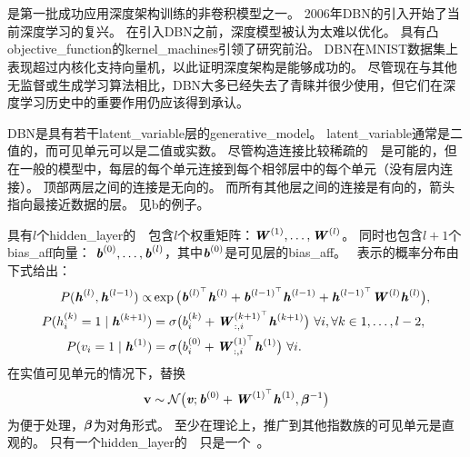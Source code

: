 
\section{}
\label{sec:deep_belief_networks}

是第一批成功应用深度架构训练的非卷积模型之一\citep{Hinton06,hinton2007learning}。
2006年\gls{DBN}的引入开始了当前深度学习的复兴。
在引入\gls{DBN}之前，深度模型被认为太难以优化。
具有凸\gls{objective_function}的\gls{kernel_machines}引领了研究前沿。
\gls{DBN}在MNIST数据集上表现超过内核化支持向量机，以此证明深度架构是能够成功的\citep{Hinton06}。
尽管现在与其他无监督或生成学习算法相比，\gls{DBN}大多已经失去了青睐并很少使用，但它们在深度学习历史中的重要作用仍应该得到承认。

\gls{DBN}是具有若干\gls{latent_variable}层的\gls{generative_model}。
\gls{latent_variable}通常是二值的，而可见单元可以是二值或实数。
尽管构造连接比较稀疏的~~是可能的，但在一般的模型中，每层的每个单元连接到每个相邻层中的每个单元（没有层内连接）。
顶部两层之间的连接是无向的。
而所有其他层之间的连接是有向的，箭头指向最接近数据的层。
见b的例子。


具有$l$个\gls{hidden_layer}的~~包含$l$个权重矩阵：$\boldsymbol{\mathit{W}}^{(1)},\ldots, \boldsymbol{\mathit{W}}^{(l)}$。
同时也包含$l+1$个\gls{bias_aff}向量：
$\boldsymbol{\mathit{b}}^{(0)},\ldots,\boldsymbol{\mathit{b}}^{(l)}$，其中$\boldsymbol{\mathit{b}}^{(0)}$是可见层的\gls{bias_aff}。
~表示的概率分布由下式给出：
\begin{align}
 P(\boldsymbol{\mathit{h}}^{(l)}, \boldsymbol{\mathit{h}}^{(l-1)}) \propto& \exp \big( \boldsymbol{\mathit{b}}^{(l)^\top} \boldsymbol{\mathit{h}}^{(l)} +  \boldsymbol{\mathit{b}}^{(l-1)^\top} \boldsymbol{\mathit{h}}^{(l-1)}
 + \boldsymbol{\mathit{h}}^{(l-1)^\top} \boldsymbol{\mathit{W}}^{(l)} \boldsymbol{\mathit{h}}^{(l)} \big), \\
 P(h_i^{(k)} = 1  \mid  \boldsymbol{\mathit{h}}^{(k+1)}) &= \sigma \big( b_i^{(k)} + \boldsymbol{\mathit{W}}_{:,i}^{(k+1)^\top} \boldsymbol{\mathit{h}}^{(k+1)} 
                                                          \big)~ \forall i,  \forall k \in 1, \ldots, l-2, \\
P(v_i = 1  \mid  \boldsymbol{\mathit{h}}^{(1)}) &=  \sigma \big( b_i^{(0)} + \boldsymbol{\mathit{W}}_{:,i}^{(1)^\top} \boldsymbol{\mathit{h}}^{(1)} 
                                                          \big)~ \forall i.
\end{align}
在实值可见单元的情况下，替换
\begin{align}
 \mathbf{v} \sim \mathcal{N} \big( \boldsymbol{\mathit{v}}; \boldsymbol{\mathit{b}}^{(0)} + \boldsymbol{\mathit{W}}^{(1)^\top} \boldsymbol{\mathit{h}}^{(1)}, \boldsymbol{\beta}^{-1} \big)
\end{align}
为便于处理，$\boldsymbol{\beta}$为对角形式。
至少在理论上，推广到其他指数族的可见单元是直观的。
只有一个\gls{hidden_layer}的~~只是一个~。

